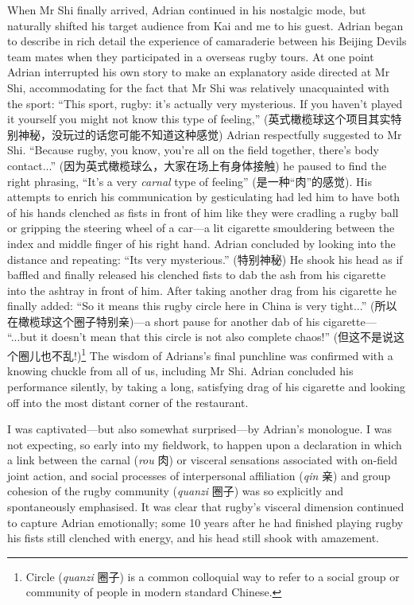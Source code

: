 \begin{CJK}{UTF8}{gbsn}
When Mr Shi finally arrived, Adrian continued in his nostalgic mode, but naturally shifted his target audience from Kai and me to his guest.  Adrian began to describe in rich detail the experience of camaraderie between his Beijing Devils team mates when they participated in a overseas rugby tours.  At one point Adrian interrupted his own story to make an explanatory aside directed at Mr Shi, accommodating for the fact that Mr Shi was relatively unacquainted with the sport: ``This sport, rugby: it's actually very mysterious. If you haven't played it yourself you might not know this type of feeling,'' (英式橄榄球这个项目其实特别神秘，没玩过的话您可能不知道这种感觉) Adrian respectfully suggested to Mr Shi.  ``Because rugby, you know, you're all on the field together, there's body contact...'' (因为英式橄榄球么，大家在场上有身体接触) he paused to find the right phrasing,  ``It's a very \textit{carnal} type of feeling'' (是一种``肉''的感觉).  His attempts to enrich his communication by gesticulating had led him to have both of his hands clenched as fists in front of him like they were cradling a rugby ball or gripping the steering wheel of a car---a lit cigarette smouldering between the index and middle finger of his right hand.  Adrian concluded by looking into the distance and repeating: ``Its very mysterious.'' (特别神秘) He shook his head as if baffled and finally released his clenched fists to dab the ash from his cigarette into the ashtray in front of him.  After taking another drag from his cigarette he finally added: ``So it means this rugby circle here in China is very tight...'' (所以在橄榄球这个圈子特别亲)---a short pause for another dab of his cigarette--- ``...but it doesn't mean that this circle is not also complete chaos!'' (但这不是说这个圈儿也不乱!)\footnote{Circle (\textit{quanzi} 圈子) is a common colloquial way to refer to a social group or community of people in modern standard Chinese.}
The wisdom of Adrians's final punchline was confirmed with a knowing chuckle from all of us, including Mr Shi. Adrian concluded his performance silently, by taking a long, satisfying drag of his cigarette and looking off into the most distant corner of the restaurant.

I was captivated---but also somewhat surprised---by Adrian's monologue.  I was not expecting, so early into my fieldwork, to happen upon a declaration in which a link between the carnal (\textit{rou} 肉) or visceral sensations associated with on-field joint action, and social processes of interpersonal affiliation (\textit{qin} 亲) and group cohesion of the rugby community (\textit{quanzi} 圈子) was so explicitly and spontaneously emphasised.  It was clear that rugby's visceral dimension continued to capture Adrian emotionally; some 10 years after he had finished playing rugby his fists still clenched with energy, and his head still shook with amazement.


\end{CJK}
